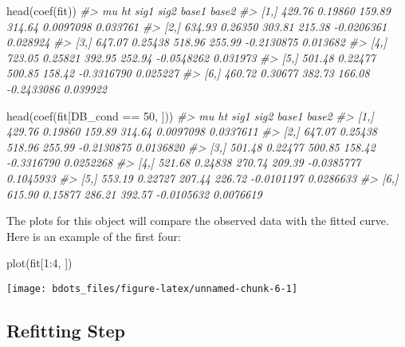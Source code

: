 \documentclass[
]{article}
\newenvironment{Shaded}{\begin{snugshade}}{\end{snugshade}}
\newcommand{\CommentTok}[1]{\textcolor[rgb]{0.56,0.35,0.01}{\textit{#1}}}
\newcommand{\DecValTok}[1]{\textcolor[rgb]{0.00,0.00,0.81}{#1}}
\newcommand{\FunctionTok}[1]{\textcolor[rgb]{0.00,0.00,0.00}{#1}}
\newcommand{\NormalTok}[1]{#1}
\newcommand{\SpecialCharTok}[1]{\textcolor[rgb]{0.00,0.00,0.00}{#1}}
\begin{document}
\begin{Shaded}
\begin{Highlighting}[]
\FunctionTok{head}\NormalTok{(}\FunctionTok{coef}\NormalTok{(fit))}
\CommentTok{\#\textgreater{}          mu      ht   sig1   sig2      base1    base2}
\CommentTok{\#\textgreater{} [1,] 429.76 0.19860 159.89 314.64  0.0097098 0.033761}
\CommentTok{\#\textgreater{} [2,] 634.93 0.26350 303.81 215.38 {-}0.0206361 0.028924}
\CommentTok{\#\textgreater{} [3,] 647.07 0.25438 518.96 255.99 {-}0.2130875 0.013682}
\CommentTok{\#\textgreater{} [4,] 723.05 0.25821 392.95 252.94 {-}0.0548262 0.031973}
\CommentTok{\#\textgreater{} [5,] 501.48 0.22477 500.85 158.42 {-}0.3316790 0.025227}
\CommentTok{\#\textgreater{} [6,] 460.72 0.30677 382.73 166.08 {-}0.2433086 0.039922}

\FunctionTok{head}\NormalTok{(}\FunctionTok{coef}\NormalTok{(fit[DB\_cond }\SpecialCharTok{==} \DecValTok{50}\NormalTok{, ]))}
\CommentTok{\#\textgreater{}          mu      ht   sig1   sig2      base1     base2}
\CommentTok{\#\textgreater{} [1,] 429.76 0.19860 159.89 314.64  0.0097098 0.0337611}
\CommentTok{\#\textgreater{} [2,] 647.07 0.25438 518.96 255.99 {-}0.2130875 0.0136820}
\CommentTok{\#\textgreater{} [3,] 501.48 0.22477 500.85 158.42 {-}0.3316790 0.0252268}
\CommentTok{\#\textgreater{} [4,] 521.68 0.24838 270.74 209.39 {-}0.0385777 0.1045933}
\CommentTok{\#\textgreater{} [5,] 553.19 0.22727 207.44 226.72 {-}0.0101197 0.0286633}
\CommentTok{\#\textgreater{} [6,] 615.90 0.15877 286.21 392.57 {-}0.0105632 0.0076619}
\end{Highlighting}
\end{Shaded}

The plots for this object will compare the observed data with the fitted
curve. Here is an example of the first four:

\begin{Shaded}
\begin{Highlighting}[]
\FunctionTok{plot}\NormalTok{(fit[}\DecValTok{1}\SpecialCharTok{:}\DecValTok{4}\NormalTok{, ])}
\end{Highlighting}
\end{Shaded}

\begin{center}\texttt{[image: bdots\_files/figure-latex/unnamed-chunk-6-1]} \end{center}

\hypertarget{refitting-step}{%
\subsection{Refitting Step}\label{refitting-step}}
\end{document}

